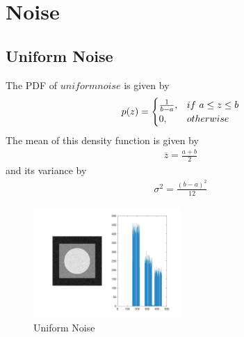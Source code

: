 \documentclass[11pt,oneside]{book}
\begin{document}
\section{Noise}
\subsection{Uniform Noise}
The PDF of $uniform noise$ is given by\\
\begin{eqnarray}p(z)=
\begin{cases}
\frac{1}{b-a}, &if\ a \le z\le b\cr 0, &otherwise\end{cases}
\end{eqnarray}
The mean of this density function is given by\\
\begin{align}
\overline z =\frac{a+b}{2}
\end{align}
and its variance by\\
\begin{align}
\sigma ^{2} = \frac{(b-a)^2}{12}
\end{align}

\begin{figure}[!htb]
   \centering  
   \includegraphics[width=0.5\textwidth]{images/4/uniform.jpg}
   \caption{Uniform Noise}  
\end{figure}
\newpage
\end{document}
